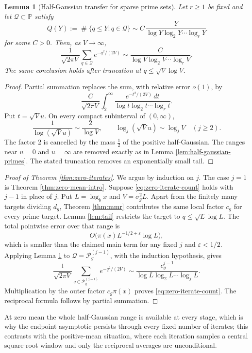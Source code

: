 \documentclass[11pt,reqno]{amsart}
\theoremstyle{plain}
\newtheorem{lemma}[theorem]{Lemma}
\theoremstyle{definition}
\newcommand{\Pp}{\mathbb{P}}
\newcommand{\eps}{\varepsilon}
\newcommand{\1}{\mathbf 1}
\DeclareMathOperator{\Card}{\#}
\begin{document}
\begin{lemma}[Half-Gaussian transfer for sparse prime sets]\label{lem:gaussian-sparse}
Let $r\ge1$ be fixed and let $\mathcal Q\subset\Pp$ satisfy
\[
 Q(Y):=\Card\{q\le Y:q\in\mathcal Q\}
 \sim C\,\frac{Y}{\log Y\log_2Y\cdots\log_rY}
\]
for some $C>0$.  Then, as $V\to\infty$,
\[
 \frac1{\sqrt{2\pi V}}
 \sum_{q\in\mathcal Q}e^{-q^2/(2V)}
 \sim
 \frac{C}{\log V\log_2V\cdots\log_rV}.
\]
The same conclusion holds after truncation at $q\le\sqrt V\log V$.
\end{lemma}

\begin{proof}
Partial summation replaces the sum, with relative error $o(1)$, by
\[
 \frac C{\sqrt{2\pi V}}
 \int_2^\infty
 \frac{e^{-t^2/(2V)}\,dt}
 {\log t\log_2t\cdots\log_rt}.
\]
Put $t=\sqrt V u$.  On every compact subinterval of $(0,\infty)$,
\[
 \frac1{\log(\sqrt V u)}\sim\frac2{\log V},
 \qquad
 \log_j(\sqrt V u)\sim\log_jV\quad(j\ge2).
\]
The factor $2$ is cancelled by the mass $\tfrac12$ of the positive half-Gaussian.  The ranges near $u=0$ and $u=\infty$ are removed exactly as in Lemma \ref{lem:half-gaussian-primes}.  The stated truncation removes an exponentially small tail.
\end{proof}

\begin{proof}[Proof of Theorem \ref{thm:zero-iterates}]
We argue by induction on $j$.  The case $j=1$ is Theorem \ref{thm:zero-mean-intro}.  Suppose \eqref{eq:zero-iterate-count} holds with $j-1$ in place of $j$.  Put $L=\log_bx$ and $V=\sigma_g^2L$.  Apart from the finitely many targets dividing $d_g$, Theorem \ref{thm:mmr} contributes the same local factor $c_g$ for every prime target.  Lemma \ref{lem:tail} restricts the target to $q\le\sqrt L\log L$.  The total pointwise error over that range is
\[
 O\big(\pi(x)L^{-1/2+\eps}\log L\big),
\]
which is smaller than the claimed main term for any fixed $j$ and $\eps<1/2$.  Applying Lemma \ref{lem:gaussian-sparse} to $\mathcal Q=\mathcal P_g^{(j-1)}$, with the induction hypothesis, gives
\[
 \frac1{\sqrt{2\pi V}}
 \sum_{q\in\mathcal P_g^{(j-1)}}e^{-q^2/(2V)}
 \sim
 \frac{c_g^{j-1}}
 {\log L\log_2L\cdots\log_jL}.
\]
Multiplication by the outer factor $c_g\pi(x)$ proves \eqref{eq:zero-iterate-count}.  The reciprocal formula follows by partial summation.
\end{proof}

At zero mean the whole half-Gaussian range is available at every stage, which is why the endpoint asymptotic persists through every fixed number of iterates; this contrasts with the positive-mean situation, where each iteration samples a central square-root window and only the reciprocal averages are unconditional.
\end{document}
